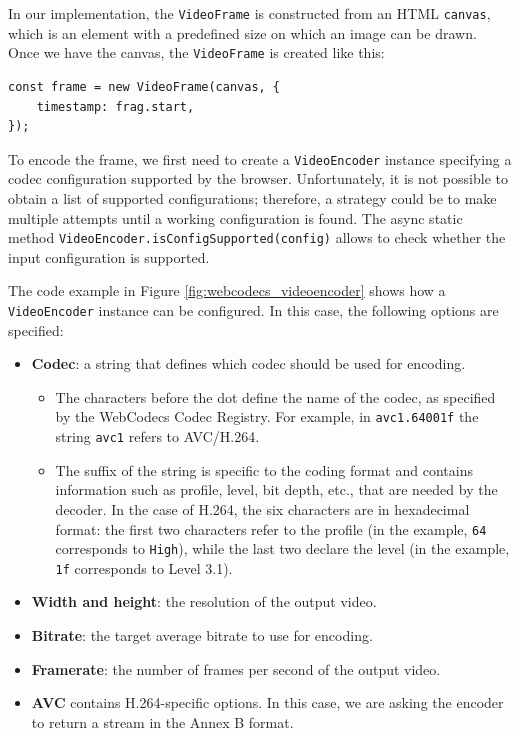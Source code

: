 In our implementation, the \texttt{VideoFrame} is constructed from an HTML \texttt{canvas}, which is an element with a predefined size on which an image can be drawn. Once we have the canvas, the \texttt{VideoFrame} is created like this:

\begin{verbatim}
const frame = new VideoFrame(canvas, {
    timestamp: frag.start,
});
\end{verbatim}

To encode the frame, we first need to create a \texttt{VideoEncoder} instance specifying a codec configuration supported by the browser. Unfortunately, it is not possible to obtain a list of supported configurations; therefore, a strategy could be to make multiple attempts until a working configuration is found. The async static method \texttt{VideoEncoder.isConfigSupported(config)} allows to check whether the input configuration is supported.

The code example in Figure \ref{fig:webcodecs_videoencoder} shows how a \texttt{VideoEncoder} instance can be configured. In this case, the following options are specified:

\begin{itemize}
    \item \textbf{Codec}: a string that defines which codec should be used for encoding.
    \begin{itemize}
        \item The characters before the dot define the name of the codec, as specified by the WebCodecs Codec Registry.\cite{webcodecs_registry} For example, in \texttt{avc1.64001f} the string \texttt{avc1} refers to AVC/H.264.
        \item The suffix of the string is specific to the coding format and contains information such as profile, level, bit depth, etc., that are needed by the decoder. In the case of H.264, the six characters are in hexadecimal format: the first two characters refer to the profile (in the example, \texttt{64} corresponds to \texttt{High}), while the last two declare the level (in the example, \texttt{1f} corresponds to Level 3.1).
    \end{itemize}
    \item \textbf{Width and height}: the resolution of the output video.
    \item \textbf{Bitrate}: the target average bitrate to use for encoding.
    \item \textbf{Framerate}: the number of frames per second of the output video.
    \item \textbf{AVC} contains H.264-specific options. In this case, we are asking the encoder to return a stream in the Annex B format.
\end{itemize}

